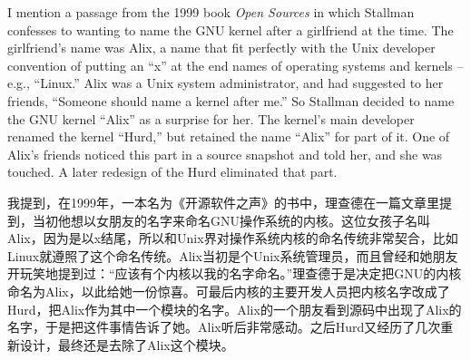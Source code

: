 \ifdefined\eng
I mention a passage from the 1999 book \textit{Open Sources} in which Stallman confesses to wanting to name the GNU kernel after a girlfriend at the time. The girlfriend's name was Alix, a name that fit perfectly with the Unix developer convention of putting an ``x'' at the end names of operating systems and kernels -- e.g., ``Linux.'' Alix was a Unix system administrator, and had suggested to her friends, ``Someone should name a kernel after me.'' So Stallman decided to name the GNU kernel ``Alix'' as a surprise for her. The kernel's main developer renamed the kernel ``Hurd,'' but retained the name ``Alix'' for part of it.  One of Alix's friends noticed this part in a source snapshot and told her, and she was touched.  A later redesign of the Hurd eliminated that part.
\fi

\ifdefined\chs
我提到，在1999年，一本名为《开源软件之声》的书中，理查德在一篇文章里提到，当初他想以女朋友的名字来命名GNU操作系统的内核。这位女孩子名叫Alix，因为是以x结尾，所以和Unix界对操作系统内核的命名传统非常契合，比如Linux就遵照了这个命名传统。Alix当初是个Unix系统管理员，而且曾经和她朋友开玩笑地提到过：“应该有个内核以我的名字命名。”理查德于是决定把GNU的内核命名为Alix，以此给她一份惊喜。可最后内核的主要开发人员把内核名字改成了Hurd，把Alix作为其中一个模块的名字。Alix的一个朋友看到源码中出现了Alix的名字，于是把这件事情告诉了她。Alix听后非常感动。之后Hurd又经历了几次重新设计，最终还是去除了Alix这个模块。
\fi

